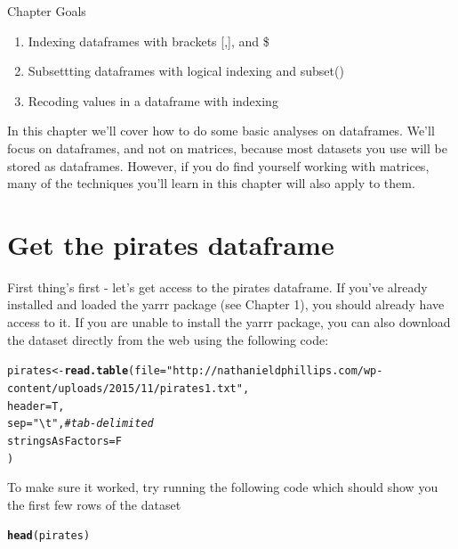 \documentclass{tufte-book}\usepackage[]{graphicx}\usepackage[]{color}
\makeatletter
\newcommand{\hlstr}[1]{\textcolor[rgb]{0.192,0.494,0.8}{#1}}%
\newcommand{\hlcom}[1]{\textcolor[rgb]{0.678,0.584,0.686}{\textit{#1}}}%
\newcommand{\hlstd}[1]{\textcolor[rgb]{0.345,0.345,0.345}{#1}}%
\newcommand{\hlkwb}[1]{\textcolor[rgb]{0.69,0.353,0.396}{#1}}%
\newcommand{\hlkwc}[1]{\textcolor[rgb]{0.333,0.667,0.333}{#1}}%
\newcommand{\hlkwd}[1]{\textcolor[rgb]{0.737,0.353,0.396}{\textbf{#1}}}%
\newenvironment{kframe}{%
 \def\at@end@of@kframe{}%
 \ifinner\ifhmode%
  \def\at@end@of@kframe{\end{minipage}}%
  \begin{minipage}{\columnwidth}%
 \fi\fi%
 \def\FrameCommand##1{\hskip\@totalleftmargin \hskip-\fboxsep
 \colorbox{shadecolor}{##1}\hskip-\fboxsep
     \hskip-\linewidth \hskip-\@totalleftmargin \hskip\columnwidth}%
 \MakeFramed {\advance\hsize-\width
   \@totalleftmargin\z@ \linewidth\hsize
   \@setminipage}}%
 {\par\unskip\endMakeFramed%
 \at@end@of@kframe}
\newenvironment{knitrout}{}{} %
\makeatother
\begin{document}
Chapter Goals

\begin{enumerate}
  \item Indexing dataframes with brackets [,], and \$
  \item Subsettting dataframes with logical indexing and subset()
  \item Recoding values in a dataframe with indexing
\end{enumerate}

In this chapter we'll cover how to do some basic analyses on dataframes. We'll focus on dataframes, and not on matrices, because most datasets you use will be stored as dataframes. However, if you do find yourself working with matrices, many of the techniques you'll learn in this chapter will also apply to them.

\section{Get the pirates dataframe}

First thing's first - let's get access to the pirates dataframe. If you've already installed and loaded the yarrr package (see Chapter 1), you should already have access to it. If you are unable to install the yarrr package, you can also download the dataset directly from the web using the following code:

\begin{footnotesize}
\begin{knitrout}
\color{fgcolor}\begin{kframe}
\begin{alltt}
\hlstd{pirates} \hlkwb{<-} \hlkwd{read.table}\hlstd{(}\hlkwc{file} \hlstd{=} \hlstr{"http://nathanieldphillips.com/wp-content/uploads/2015/11/pirates1.txt"}\hlstd{,}
                      \hlkwc{header} \hlstd{= T,}
                      \hlkwc{sep} \hlstd{=} \hlstr{"\textbackslash{}t"}\hlstd{,} \hlcom{# tab-delimited}
                      \hlkwc{stringsAsFactors} \hlstd{= F}
                      \hlstd{)}
\end{alltt}
\end{kframe}
\end{knitrout}
\end{footnotesize}

To make sure it worked, try running the following code which should show you the first few rows of the dataset

\begin{knitrout}
\color{fgcolor}\begin{kframe}
\begin{alltt}
\hlkwd{head}\hlstd{(pirates)}
\end{alltt}
\end{kframe}
\end{knitrout}
\end{document}
